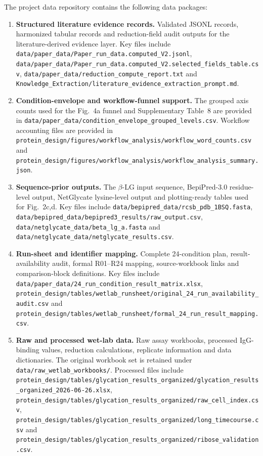 The project data repository contains the following data packages:
\begin{enumerate}
  \item \textbf{Structured literature evidence records.}
  Validated JSONL records, harmonized tabular records and reduction-field audit
  outputs for the literature-derived evidence layer. Key files include
  \nolinkurl{data/paper_data/Paper_run_data.computed_V2.jsonl},
  \nolinkurl{data/paper_data/Paper_run_data.computed_V2.selected_fields_table.csv},
  \nolinkurl{data/paper_data/reduction_compute_report.txt} and
  \nolinkurl{Knowledge_Extraction/literature_evidence_extraction_prompt.md}.

  \item \textbf{Condition-envelope and workflow-funnel support.}
  The grouped axis counts used for the Fig.~4a funnel and Supplementary
  Table~8 are provided in
  \nolinkurl{data/paper_data/condition_envelope_grouped_levels.csv}. Workflow
  accounting files are provided in
  \nolinkurl{protein_design/figures/workflow_analysis/workflow_word_counts.csv}
  and
  \nolinkurl{protein_design/figures/workflow_analysis/workflow_analysis_summary.json}.

  \item \textbf{Sequence-prior outputs.}
  The $\beta$-LG input sequence, BepiPred-3.0 residue-level output, NetGlycate
  lysine-level output and plotting-ready tables used for Fig.~2c,d. Key files
  include \nolinkurl{data/bepipred_data/rcsb_pdb_1BSQ.fasta},
  \nolinkurl{data/bepipred_data/bepipred3_results/raw_output.csv},
  \nolinkurl{data/netglycate_data/beta_lg_a.fasta} and
  \nolinkurl{data/netglycate_data/netglycate_results.csv}.

  \item \textbf{Run-sheet and identifier mapping.}
  Complete 24-condition plan, result-availability audit, formal R01--R24 mapping,
  source-workbook links and comparison-block definitions. Key files include
  \nolinkurl{data/paper_data/24_run_condition_result_matrix.xlsx},
  \nolinkurl{protein_design/tables/wetlab_runsheet/original_24_run_availability_audit.csv}
  and
  \nolinkurl{protein_design/tables/wetlab_runsheet/formal_24_run_result_mapping.csv}.

  \item \textbf{Raw and processed wet-lab data.}
  Raw assay workbooks, processed IgG-binding values, reduction calculations,
  replicate information and data dictionaries. The original workbook set is
  retained under \nolinkurl{data/raw_wetlab_workbooks/}. Processed files include
  \nolinkurl{protein_design/tables/glycation_results_organized/glycation_results_organized_2026-06-26.xlsx},
  \nolinkurl{protein_design/tables/glycation_results_organized/raw_cell_index.csv},
  \nolinkurl{protein_design/tables/glycation_results_organized/long_timecourse.csv}
  and
  \nolinkurl{protein_design/tables/glycation_results_organized/ribose_validation.csv}.


\end{enumerate}
